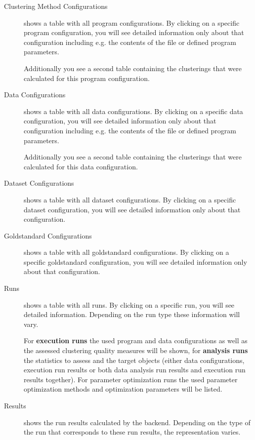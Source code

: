 	\begin{description}
		\item[Clustering Method Configurations] shows a table with all program configurations.
		By clicking on a specific program configuration, you will see detailed information only about that configuration including e.g. the contents of the file or defined program parameters.
		
		Additionally you see a second table containing the clusterings that were calculated for this program configuration.
		
		\item[Data Configurations] shows a table with all data configurations.
		By clicking on a specific data configuration, you will see detailed information only about that configuration including e.g. the contents of the file or defined program parameters.
		
		Additionally you see a second table containing the clusterings that were calculated for this data configuration.
		
		\item[Dataset Configurations] shows a table with all dataset configurations.
		By clicking on a specific dataset configuration, you will see detailed information only about that configuration.
		
		\item[Goldstandard Configurations] shows a table with all goldstandard configurations.
		By clicking on a specific goldstandard configuration, you will see detailed information only about that configuration.
		
		\item[Runs] shows a table with all runs.
		By clicking on a specific run, you will see detailed information. Depending on the run type these information will vary.
		
		For \textbf{execution runs} the used program and data configurations as well as the assessed clustering quality measures will be shown, for \textbf{analysis runs} the statistics to assess and the target objects (either data configurations, execution run results or both data analysis run results and execution run results together). For parameter optimization runs the used parameter optimization methods and optimization parameters will be listed.
		\item[Results] shows the run results calculated by the backend. Depending on the type of the run that corresponds to these run results, the representation varies.
		

\end{description}
